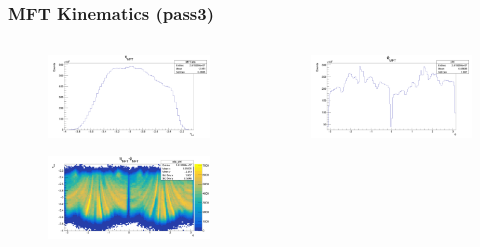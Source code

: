 \documentclass[11pt]{beamer}
\begin{document}
\begin{frame}
    \frametitle{MFT Kinematics (pass3)}

    \begin{columns}[c]
        \begin{column}{0.5\textwidth}
            \begin{figure}
                \begin{center}
                    \includegraphics[width=\textwidth]{Plots/MFT_pass3/eta.png}
                \end{center}
            \end{figure}
            \begin{figure}
                \begin{center}
                    \includegraphics[width=\textwidth]{Plots/MFT_pass3/eta-phi.png}
                \end{center}
            \end{figure}
        \end{column}
        \begin{column}{0.5\textwidth}
            \begin{figure}
                \begin{center}
                    \includegraphics[width=\textwidth]{Plots/MFT_pass3/phi.png}

\end{center}
\end{figure}
\end{column}
\end{columns}
\end{frame}
\end{document}
